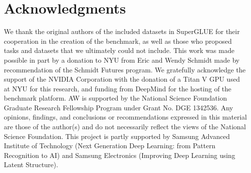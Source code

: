 \section{Acknowledgments}

We thank the original authors of the included datasets in SuperGLUE for their cooperation in the creation of the benchmark, as well as those who proposed tasks and datasets that we ultimately could not include.
This work was made possible in part by a donation to NYU from Eric and Wendy Schmidt made by recommendation of the Schmidt Futures program. We gratefully acknowledge the support of the NVIDIA Corporation with the donation of a Titan V GPU used at NYU for this research, and funding from DeepMind for the hosting of the benchmark platform.
AW is supported by the National Science Foundation Graduate Research Fellowship Program under Grant No. DGE 1342536. Any opinions, findings, and conclusions or recommendations expressed in this material are those of the author(s) and do not necessarily reflect the views of the National Science Foundation.
This project is partly supported by Samsung Advanced Institute of Technology (Next Generation Deep Learning: from Pattern Recognition to AI) and Samsung Electronics (Improving Deep Learning using Latent Structure).

\clearpage

